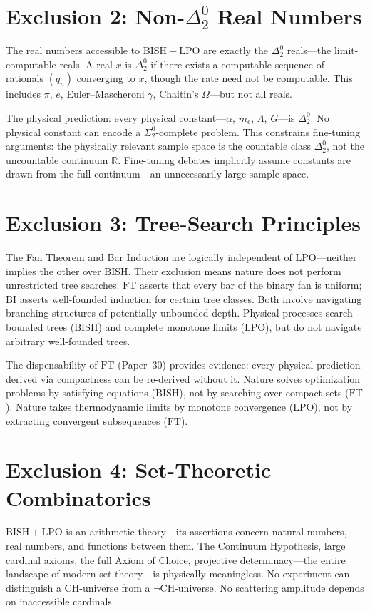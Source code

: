 \documentclass[11pt,a4paper]{report}
\theoremstyle{plain}
\theoremstyle{definition}
\theoremstyle{remark}
\newcommand{\BISH}{\mathrm{BISH}}
\newcommand{\LPO}{\mathrm{LPO}}
\newcommand{\FT}{\mathrm{FT}}
\newcommand{\BI}{\mathrm{BI}}
\newcommand{\RR}{\mathbb{R}}
\begin{document}
\section{Exclusion 2: Non-$\Delta^0_2$ Real Numbers}

The real numbers accessible to $\BISH+\LPO$ are exactly the $\Delta^0_2$ reals---the limit-computable reals. A real $x$ is $\Delta^0_2$ if there exists a computable sequence of rationals $(q_n)$ converging to $x$, though the rate need not be computable. This includes $\pi$, $e$, Euler--Mascheroni $\gamma$, Chaitin's $\Omega$---but not all reals.

The physical prediction: every physical constant---$\alpha$, $m_e$, $\Lambda$, $G$---is $\Delta^0_2$. No physical constant can encode a $\Sigma^0_2$-complete problem. This constrains fine-tuning arguments: the physically relevant sample space is the countable class $\Delta^0_2$, not the uncountable continuum $\RR$. Fine-tuning debates implicitly assume constants are drawn from the full continuum---an unnecessarily large sample space.

\section{Exclusion 3: Tree-Search Principles}

The Fan Theorem and Bar Induction are logically independent of $\LPO$---neither implies the other over $\BISH$. Their exclusion means nature does not perform unrestricted tree searches. $\FT$ asserts that every bar of the binary fan is uniform; $\BI$ asserts well-founded induction for certain tree classes. Both involve navigating branching structures of potentially unbounded depth. Physical processes search bounded trees ($\BISH$) and complete monotone limits ($\LPO$), but do not navigate arbitrary well-founded trees.

The dispensability of $\FT$ (Paper~30) provides evidence: every physical prediction derived via compactness can be re-derived without it. Nature solves optimization problems by satisfying equations ($\BISH$), not by searching over compact sets ($\FT$). Nature takes thermodynamic limits by monotone convergence ($\LPO$), not by extracting convergent subsequences ($\FT$).

\section{Exclusion 4: Set-Theoretic Combinatorics}

$\BISH+\LPO$ is an arithmetic theory---its assertions concern natural numbers, real numbers, and functions between them. The Continuum Hypothesis, large cardinal axioms, the full Axiom of Choice, projective determinacy---the entire landscape of modern set theory---is physically meaningless. No experiment can distinguish a CH-universe from a $\neg$CH-universe. No scattering amplitude depends on inaccessible cardinals.
\end{document}

